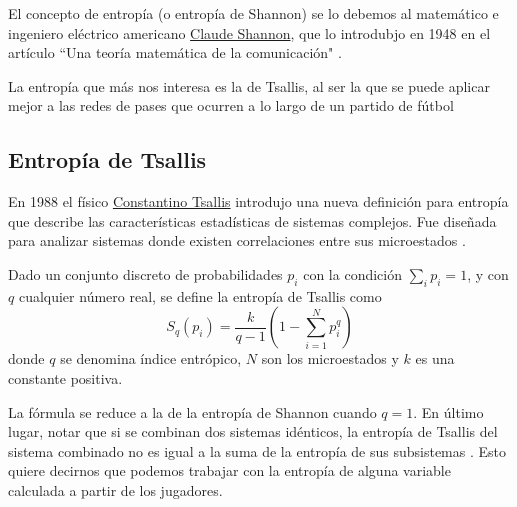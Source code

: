 El concepto de entropía (o entropía de Shannon) se lo debemos al matemático e ingeniero eléctrico americano 
\href{https://en.wikipedia.org/wiki/Claude_Shannon}{Claude Shannon}, que lo introdubjo en 1948 en el 
artículo ``Una teoría matemática de la comunicación" \cite{shannon-1948}.

La entropía que más nos interesa es la de Tsallis, al ser la que se puede aplicar mejor a las redes de pases 
que ocurren a lo largo de un partido de fútbol
\subsection{Entropía de Tsallis}
En 1988 el físico \href{https://en.wikipedia.org/wiki/Constantino_Tsallis}{Constantino Tsallis} 
introdujo una nueva definición para entropía que describe las características estadísticas de sistemas 
complejos. Fue diseñada para analizar sistemas donde existen correlaciones entre sus microestados \cite{tsallis}.
\begin{definicion} \label{def:tsallis_entropy}
Dado un conjunto discreto de probabilidades ${p_i}$ con la condición $\sum_{i} p_i = 1$, y con $q$ 
cualquier número real, se define la entropía de Tsallis como
$$ S_q(p_i)=\frac{k}{q-1}\left(1- \sum_{i=1}^{N}p_{i}^{q}\right)$$
donde $q$ se denomina índice entrópico, $N$ son los microestados y $k$ es una constante positiva.
\end{definicion}

La fórmula se reduce a la de la entropía de Shannon cuando $q=1$. En último lugar, notar que si se 
combinan dos sistemas idénticos, 
la entropía de Tsallis del sistema combinado no es igual a la suma de la entropía de sus 
subsistemas \cite{comparison-entropies}. Esto quiere decirnos que podemos trabajar con la entropía de 
alguna variable calculada a partir de los jugadores.
